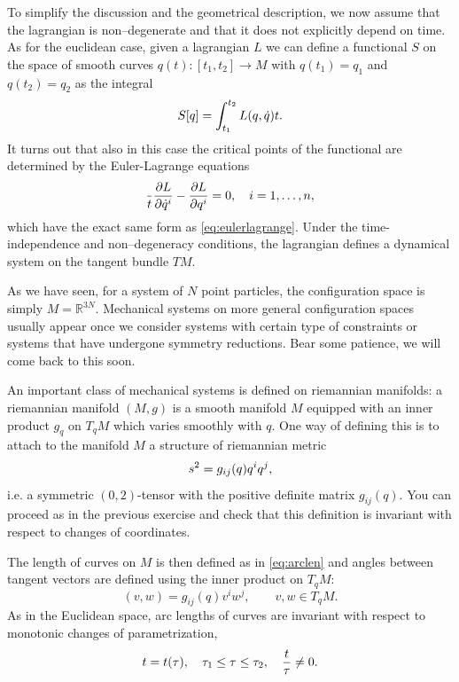 \documentclass[english,fontsize=11pt,paper=a5,oneside]{scrbook}
\newcommand{\R}{\mathbb{R}}
\let\d\relax
\DeclareMathOperator{\d}{d}
\theoremstyle{definition}
\begin{document}
To simplify the discussion and the geometrical description, we now assume that the lagrangian is non--degenerate and that it does not explicitly depend on time.
As for the euclidean case, given a lagrangian $L$ we can define a functional $S$ on the space of smooth curves $q(t): [t_1,t_2] \to M$ with $q(t_1) = q_1$ and $q(t_2) = q_2$ as the integral
\begin{equation}
    S[q] = \int_{t_1}^{t_2} L(q,\dot q) \d t.
\end{equation}
It turns out that also in this case the critical points of the functional are determined by the Euler-Lagrange equations
\begin{equation}
    \frac{\d}{\d t}\frac{\partial L}{\partial \dot q^i} - \frac{\partial L}{\partial q^i} =0, \quad i=1,\ldots,n,
\end{equation}
which have the exact same form as \eqref{eq:eulerlagrange}.
Under the time-independence and non--degeneracy conditions, the lagrangian defines a dynamical system on the tangent bundle $TM$.

As we have seen, for a system of $N$ point particles, the configuration space is simply $M=\R^{3N}$. Mechanical systems on more general configuration spaces usually appear once we consider systems with certain type of constraints or systems that have undergone symmetry reductions.
Bear some patience, we will come back to this soon.

An important class of mechanical systems is defined on riemannian manifolds: a riemannian manifold $(M, g)$ is a smooth manifold $M$ equipped with an inner product $g_q$ on $T_q M$ which varies smoothly with $q$. One way of defining this is to attach to the manifold $M$ a structure of riemannian metric
\begin{equation}
    \d s^2 = g_{ij}(q) \d q^i \d q^j,
\end{equation}
i.e. a symmetric $(0,2)$-tensor with the positive definite matrix $g_{ij}(q)$.
You can proceed as in the previous exercise and check that this definition is invariant with respect to changes of coordinates.

The length of curves on $M$ is then defined as in \eqref{eq:arclen} and angles between tangent vectors are defined using the inner product on $T_qM$:
\begin{equation}
    (v, w) = g_{ij}(q) v^i w^j, \qquad v,w\in T_q M.
\end{equation}
As in the Euclidean space, arc lengths of curves are invariant with respect to monotonic changes of parametrization,
\begin{equation}
    t = t(\tau),\quad \tau_1\leq \tau\leq \tau_2, \quad \frac{\d t}{\d \tau}\neq 0.
\end{equation}
\end{document}
